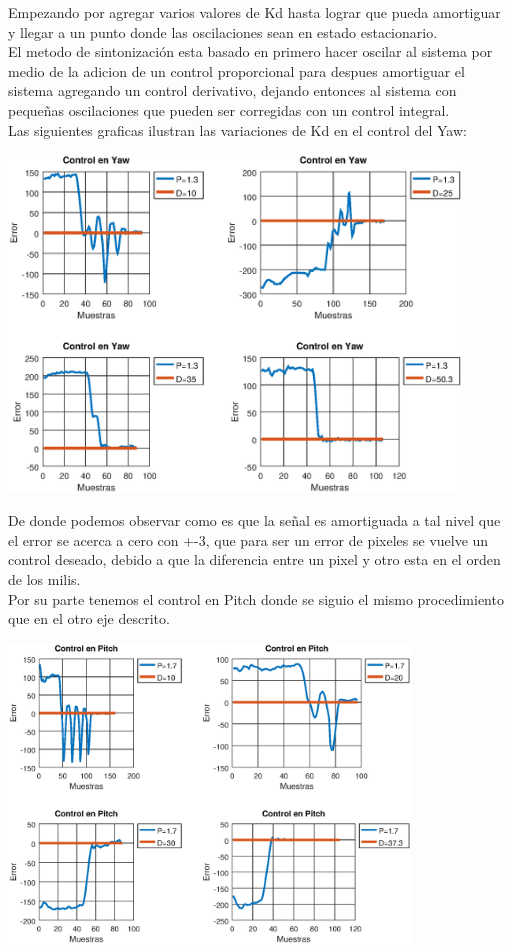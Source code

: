 Empezando por agregar varios valores de Kd hasta lograr que pueda amortiguar y llegar a un punto donde las oscilaciones sean en estado
estacionario.\\
El metodo de sintonización esta basado en primero hacer oscilar al sistema por medio de la adicion de un control proporcional para despues 
amortiguar el sistema agregando un control derivativo, dejando entonces al sistema con pequeñas oscilaciones que pueden ser corregidas con un 
control integral. \\
Las siguientes graficas ilustran las variaciones de Kd en el control del Yaw:
\begin{center}
	\includegraphics[width=0.9\textwidth]{Contenido/Cuerpo/Capitulo5/Fig10.eps}
	\label{Fig4}
\end{center}
De donde podemos observar como es que la señal es amortiguada a tal nivel que el error se acerca a cero con +-3, que para ser
un error de pixeles se vuelve un control deseado, debido a que la diferencia entre un pixel y otro esta en el orden de los milis.\\
Por su parte tenemos el control en Pitch donde se siguio el mismo procedimiento que en el otro eje descrito.
\begin{center}
	\includegraphics[width=0.8\textwidth]{Contenido/Cuerpo/Capitulo5/Fig11.eps}
	\label{Fig4}
\end{center}
